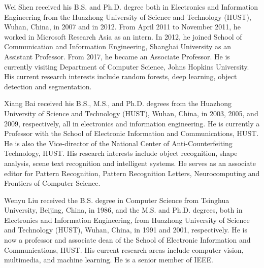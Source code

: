 \documentclass[10pt,journal,compsoc]{IEEEtran}
\begin{document}
\begin{IEEEbiography}{Wei Shen}
received his B.S. and Ph.D. degree both in Electronics and Information Engineering from the Huazhong University of Science and Technology (HUST), Wuhan, China, in 2007 and in 2012.
From April 2011 to November 2011, he worked in Microsoft Research Asia as an intern. In 2012, he joined School of Communication and Information Engineering, Shanghai University as an Assistant Professor. From 2017, he became an Associate Professor.
He is currently visiting Department of Computer Science, Johns Hopkins University.
His current research interests include random forests, deep learning, object detection and segmentation.
\end{IEEEbiography}

\begin{IEEEbiography}{Xiang Bai}
received his B.S., M.S., and Ph.D. degrees from the Huazhong University of Science and Technology (HUST), Wuhan, China, in 2003, 2005, and 2009, respectively, all in electronics and information engineering. He is currently a Professor with the School of Electronic Information and Communications, HUST. He is also the Vice-director of the National Center of Anti-Counterfeiting Technology, HUST. His research interests include object recognition, shape analysis, scene text recognition and intelligent systems. He serves as an associate editor for Pattern Recognition, Pattern Recognition Letters, Neurocomputing and Frontiers of Computer Science.
\end{IEEEbiography}

\begin{IEEEbiography}{Wenyu Liu}
received the B.S. degree in Computer Science from Tsinghua University, Beijing, China, in 1986, and the M.S. and Ph.D. degrees, both in Electronics and Information Engineering, from Huazhong University of Science and Technology (HUST), Wuhan, China, in 1991 and 2001, respectively. He is now a professor and associate dean of the School of Electronic Information and Communications, HUST. His current research areas include computer vision, multimedia, and machine learning. He is a senior member of IEEE.
\end{IEEEbiography}
\end{document}
